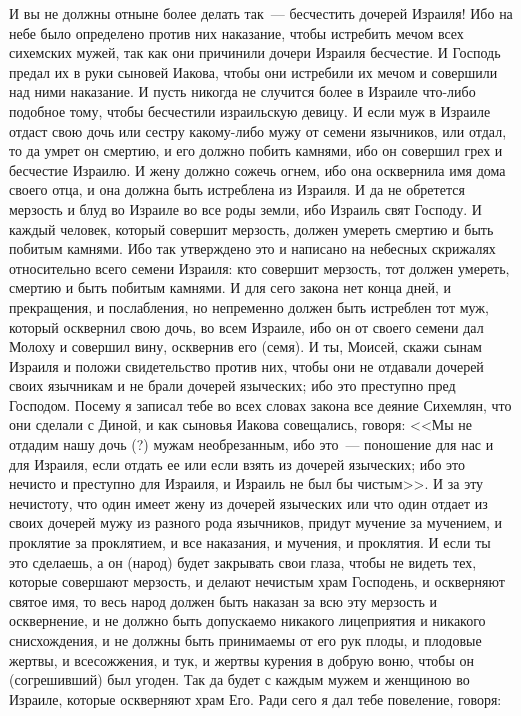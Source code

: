 И вы не должны отныне более делать так~---
бесчестить дочерей Израиля! Ибо на небе было
определено против них наказание, чтобы истребить
мечом всех сихемских мужей, так как они причинили
дочери Израиля бесчестие. И Господь предал их в
руки сыновей Иакова, чтобы они истребили их мечом
и совершили над ними наказание. И пусть никогда
не случится более в Израиле что-либо подобное
тому, чтобы бесчестили израильскую девицу. И если
муж в Израиле отдаст свою дочь или сестру
какому-либо мужу от семени язычников, или отдал,
то да умрет он смертию, и его должно побить
камнями, ибо он совершил грех и бесчестие
Израилю. И жену должно сожечь огнем, ибо она
осквернила имя дома своего отца, и она должна
быть истреблена из Израиля. И да не обретется
мерзость и блуд во Израиле во все роды земли, ибо
Израиль свят Господу. И каждый человек, который
совершит мерзость, должен умереть смертию и быть
побитым камнями. Ибо так утверждено это и
написано на небесных скрижалях относительно
всего семени Израиля: кто совершит мерзость, тот
должен умереть, смертию и быть побитым камнями. И
для сего закона нет конца дней, и прекращения, и
послабления, но непременно должен быть истреблен
тот муж, который осквернил свою дочь, во всем
Израиле, ибо он от своего семени дал Молоху и
совершил вину, осквернив его (семя). И ты, Моисей,
скажи сынам Израиля и положи свидетельство
против них, чтобы они не отдавали дочерей своих
язычникам и не брали дочерей языческих; ибо это
преступно пред Господом. Посему я записал тебе во
всех словах закона все деяние Сихемлян, что они
сделали с Диной, и как сыновья Иакова совещались,
говоря: <<Мы не отдадим нашу дочь (?) мужам
необрезанным, ибо это~--- поношение для нас и для
Израиля, если отдать ее или если взять из дочерей
языческих; ибо это нечисто и преступно для
Израиля, и Израиль не был бы чистым>>. И за эту
нечистоту, что один имеет жену из дочерей
языческих или что один отдает из своих дочерей
мужу из разного рода язычников, придут мучение за
мучением, и проклятие за проклятием, и все
наказания, и мучения, и проклятия. И если ты это
сделаешь, а он (народ) будет закрывать свои глаза, чтобы
не видеть тех, которые совершают мерзость, и
делают нечистым храм Господень, и оскверняют
святое имя, то весь народ должен быть наказан за
всю эту мерзость и осквернение, и не должно быть
допускаемо никакого лицеприятия и никакого
снисхождения, и не должны быть принимаемы от его
рук плоды, и плодовые жертвы, и всесожжения, и тук,
и жертвы курения в добрую воню, чтобы он
(согрешивший) был угоден. Так да будет с каждым
мужем и женщиною во Израиле, которые оскверняют
храм Его. Ради сего я дал тебе повеление, говоря:
